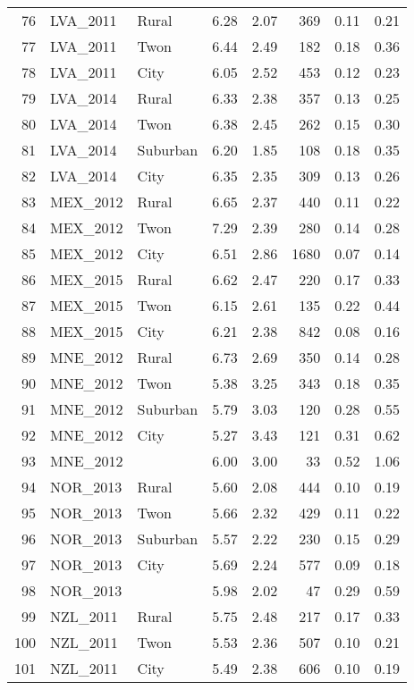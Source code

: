 \begin{table}[ht]
\begin{tabular}{rllrrrrr}
  76 & LVA\_2011 & Rural & 6.28 & 2.07 & 369 & 0.11 & 0.21 \\ 
  77 & LVA\_2011 & Twon & 6.44 & 2.49 & 182 & 0.18 & 0.36 \\ 
  78 & LVA\_2011 & City & 6.05 & 2.52 & 453 & 0.12 & 0.23 \\ 
  79 & LVA\_2014 & Rural & 6.33 & 2.38 & 357 & 0.13 & 0.25 \\ 
  80 & LVA\_2014 & Twon & 6.38 & 2.45 & 262 & 0.15 & 0.30 \\ 
  81 & LVA\_2014 & Suburban & 6.20 & 1.85 & 108 & 0.18 & 0.35 \\ 
  82 & LVA\_2014 & City & 6.35 & 2.35 & 309 & 0.13 & 0.26 \\ 
  83 & MEX\_2012 & Rural & 6.65 & 2.37 & 440 & 0.11 & 0.22 \\ 
  84 & MEX\_2012 & Twon & 7.29 & 2.39 & 280 & 0.14 & 0.28 \\ 
  85 & MEX\_2012 & City & 6.51 & 2.86 & 1680 & 0.07 & 0.14 \\ 
  86 & MEX\_2015 & Rural & 6.62 & 2.47 & 220 & 0.17 & 0.33 \\ 
  87 & MEX\_2015 & Twon & 6.15 & 2.61 & 135 & 0.22 & 0.44 \\ 
  88 & MEX\_2015 & City & 6.21 & 2.38 & 842 & 0.08 & 0.16 \\ 
  89 & MNE\_2012 & Rural & 6.73 & 2.69 & 350 & 0.14 & 0.28 \\ 
  90 & MNE\_2012 & Twon & 5.38 & 3.25 & 343 & 0.18 & 0.35 \\ 
  91 & MNE\_2012 & Suburban & 5.79 & 3.03 & 120 & 0.28 & 0.55 \\ 
  92 & MNE\_2012 & City & 5.27 & 3.43 & 121 & 0.31 & 0.62 \\ 
  93 & MNE\_2012 &  & 6.00 & 3.00 &  33 & 0.52 & 1.06 \\ 
  94 & NOR\_2013 & Rural & 5.60 & 2.08 & 444 & 0.10 & 0.19 \\ 
  95 & NOR\_2013 & Twon & 5.66 & 2.32 & 429 & 0.11 & 0.22 \\ 
  96 & NOR\_2013 & Suburban & 5.57 & 2.22 & 230 & 0.15 & 0.29 \\ 
  97 & NOR\_2013 & City & 5.69 & 2.24 & 577 & 0.09 & 0.18 \\ 
  98 & NOR\_2013 &  & 5.98 & 2.02 &  47 & 0.29 & 0.59 \\ 
  99 & NZL\_2011 & Rural & 5.75 & 2.48 & 217 & 0.17 & 0.33 \\ 
  100 & NZL\_2011 & Twon & 5.53 & 2.36 & 507 & 0.10 & 0.21 \\ 
  101 & NZL\_2011 & City & 5.49 & 2.38 & 606 & 0.10 & 0.19 \\ 

\end{tabular}
\end{table}

